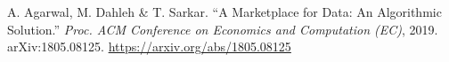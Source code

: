  A. Agarwal, M. Dahleh \& T. Sarkar. ``A Marketplace
for Data: An Algorithmic Solution.'' \emph{Proc. ACM Conference on Economics and
Computation (EC)}, 2019. arXiv:1805.08125.
\url{https://arxiv.org/abs/1805.08125}
